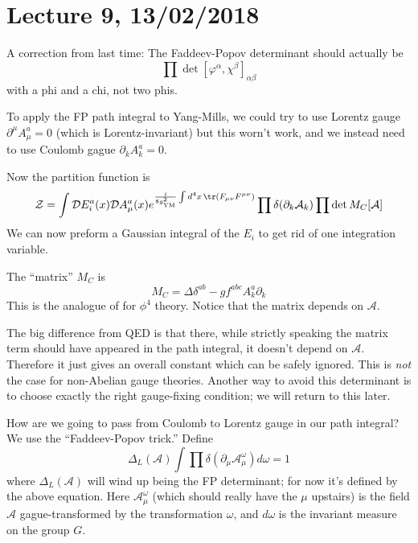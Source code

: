 \section*{Lecture 9, 13/02/2018}
A correction from last time: The Faddeev-Popov determinant should actually be
\[
\prod \det[ \varphi^\alpha, \chi^\beta]_{\alpha \beta}
\]
with a phi and a chi, not two phis.


To apply the FP path integral to Yang-Mills, we could try to use Lorentz gauge $\partial^\mu A_\mu^a = 0$ (which is Lorentz-invariant) but this worn't work, and we instead need to use Coulomb gague $\partial_k A_k^a = 0$.

Now the partition function is
\[
\mathcal Z = \int \mathcal D E_i^a(x) \mathcal D A_\mu^a(x) e^{\frac{i}{8 g^2_{\text{YM}}} \int d^4x\, \tr(F_{\mu \nu} F^{\mu \nu}) } \prod \delta(\partial_k \mathcal A_k) \prod \det M_C[\mathcal A]
\]
We can now preform a Gaussian integral of the $E_i$ to get rid of one integration variable.

The ``matrix'' $M_C$ is
\[
M_C = \Delta \delta^{ab} - g f^{abc} A_k^a \partial_k
\]
This is the analogue of  for $\phi^4$ theory.
Notice that the matrix depends on $\mathcal A$.

The big difference from QED is that there, while strictly speaking the matrix term should have appeared in the path integral, it doesn't depend on $\mathcal A$.
Therefore it just gives an overall constant which can be safely ignored.
This is \emph{not} the case for non-Abelian gauge theories.
Another way to avoid this determinant is to choose exactly the right gauge-fixing condition; we will return to this later.

How are we going to pass from Coulomb to Lorentz gauge in our path integral?
We use the ``Faddeev-Popov trick.''
Define
\[
\Delta_L(\mathcal A) \int \prod \delta(\partial_\mu \mathcal A_\mu^\omega) d \omega = 1
\]
where $\Delta_L(\mathcal A)$ will wind up being the FP determinant; for now it's defined by the above equation.
Here $\mathcal A_\mu^\omega$ (which should really have the $\mu$ upstairs) is the field $\mathcal A$ gague-transformed by the transformation $\omega$, and $d \omega$ is the invariant measure on the group $G$.

